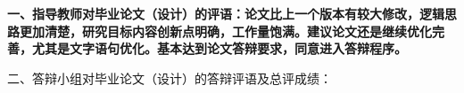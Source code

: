 \cleardoublepage{}

{
    \bfseries
    \noindent 一、指导教师对毕业论文（设计）的评语：论文比上一个版本有较大修改，逻辑思路更加清楚，研究目标内容创新点明确，工作量饱满。建议论文还是继续优化完善，尤其是文字语句优化。基本达到论文答辩要求，同意进入答辩程序。\\
    \vskip 50mm

    \signature{指导教师（签名）}

    \noindent 二、答辩小组对毕业论文（设计）的答辩评语及总评成绩：\\

    \mbox{} \vfill

    \finaleval[][][][][]

    \signature{负责人（签名）}
}
